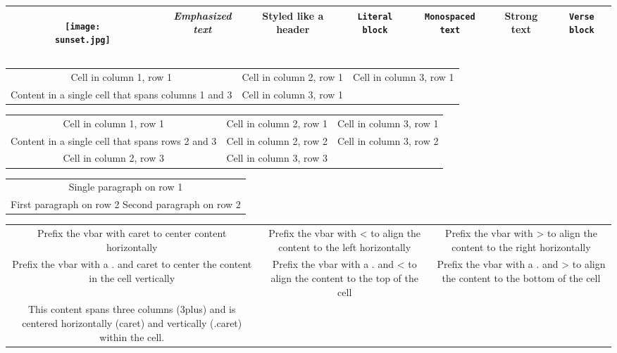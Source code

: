 \begin{center}
\begin{tabular}{|c|c|c|c|c|c|c|}
\hline
\begin{figure}[h]{}
\centering\texttt{[image: sunset.jpg]}
\end{figure}
& \emph{Emphasized text} & Styled like a header & \texttt{Literal block} & \texttt{Monospaced text} & \textbf{Strong text} & \texttt{Verse block} \\
\hline
\end{tabular}
\end{center}

\begin{center}
\begin{tabular}{|c|c|c|}
\hline
Cell in column 1, row 1 & Cell in column 2, row 1 & Cell in column 3, row 1 \\
Content in a single cell that spans columns 1 and 3 & Cell in column 3, row 1 \\
\hline
\end{tabular}
\end{center}

\begin{center}
\begin{tabular}{|c|c|c|}
\hline
Cell in column 1, row 1 & Cell in column 2, row 1 & Cell in column 3, row 1 \\
Content in a single cell that spans rows 2 and 3 & Cell in column 2, row 2 & Cell in column 3, row 2 \\
Cell in column 2, row 3 & Cell in column 3, row 3 \\
\hline
\end{tabular}
\end{center}

\begin{center}
\begin{tabular}{|c|}
\hline
Single paragraph on row 1 \\
First paragraph on row 2
Second paragraph on row 2 \\
\hline
\end{tabular}
\end{center}

\begin{center}
\begin{tabular}{|c|c|c|}
\hline
Prefix the {vbar} with {caret} to center content horizontally & Prefix the {vbar} with < to align the content to the left horizontally & Prefix the {vbar} with > to align the content to the right horizontally \\
Prefix the {vbar} with a . and {caret} to center the content in the cell vertically & Prefix the {vbar} with a . and < to align the content to the top of the cell & Prefix the {vbar} with a . and > to align the content to the bottom of the cell \\
This content spans three columns (3{plus}) and is centered horizontally ({caret}) and vertically (.{caret}) within the cell. \\
\hline
\end{tabular}
\end{center}

